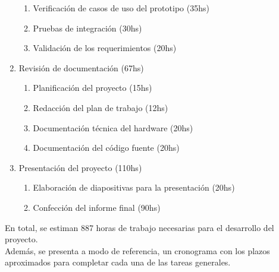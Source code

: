 \begin{enumerate}
\begin{enumerate}
        \item Verificación de casos de uso del prototipo (35hs)
        \item Pruebas de integración (30hs)
        \item Validación de los requerimientos (20hs)
    \end{enumerate}
    \item Revisión de documentación (67hs)
    \begin{enumerate}
        \item Planificación del proyecto (15hs)
        \item Redacción del plan de trabajo (12hs)
        \item Documentación técnica del hardware (20hs)
        \item Documentación del código fuente (20hs)
        
    \end{enumerate}
    \item Presentación del proyecto (110hs)
    \begin{enumerate}
        \item Elaboración de diapositivas para la presentación (20hs)
        \item Confección del informe final (90hs)
    \end{enumerate}
\end{enumerate}

En total, se estiman 887 horas de trabajo necesarias para el desarrollo del proyecto. \\

Además, se presenta a modo de referencia, un cronograma con los plazos aproximados para completar cada una de las tareas generales. 


